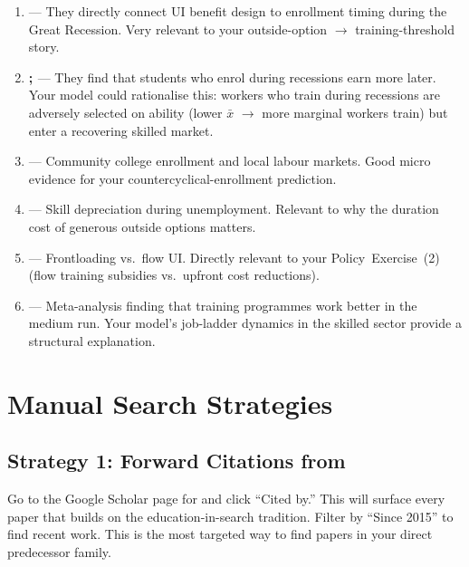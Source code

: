 \documentclass[12pt]{article}
\begin{document}
\begin{enumerate}
    \item \textbf{\citet{barr2015}} --- They directly connect UI benefit design to enrollment timing during the Great Recession. Very relevant to your outside-option $\to$ training-threshold story.

    \item \textbf{\citet{bicakova2021}; \citet{bicakova2023}} --- They find that students who enrol during recessions earn more later. Your model could rationalise this: workers who train during recessions are adversely selected on ability (lower $\bar{x}$ $\to$ more marginal workers train) but enter a recovering skilled market.

    \item \textbf{\citet{blom2021}} --- Community college enrollment and local labour markets. Good micro evidence for your countercyclical-enrollment prediction.

    \item \textbf{\citet{cohen2025}} --- Skill depreciation during unemployment. Relevant to why the duration cost of generous outside options matters.

    \item \textbf{\citet{lindner2020}} --- Frontloading vs.\ flow UI. Directly relevant to your Policy~Exercise~(2) (flow training subsidies vs.\ upfront cost reductions).

    \item \textbf{\citet{card2018}} --- Meta-analysis finding that training programmes work better in the medium run. Your model's job-ladder dynamics in the skilled sector provide a structural explanation.
\end{enumerate}


\section{Manual Search Strategies}

\subsection{Strategy 1: Forward Citations from \citet{charlot2005}}

Go to the Google Scholar page for \citet{charlot2005} and click ``Cited by.'' This will surface every paper that builds on the education-in-search tradition. Filter by ``Since 2015'' to find recent work. This is the most targeted way to find papers in your direct predecessor family.
\end{document}
